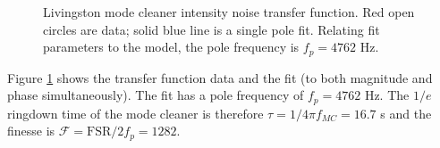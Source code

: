 \begin{figure}
\begin{centering}
\caption[Livingston mode cleaner intensity noise transfer
function]{Livingston mode cleaner intensity noise transfer
  function. Red open circles are data; solid blue line is a single
  pole fit. Relating fit parameters to the model, the pole frequency
  is $f_p=4762$ Hz.}
\label{fig:mcpole}
\end{centering}
\end{figure}

Figure \ref{fig:mcpole} shows the transfer function data and the fit
(to both magnitude and phase simultaneously). The fit has a pole
frequency of $f_p=4762$ Hz. The $1/e$ ringdown time of the mode
cleaner is therefore $\tau = 1/4\pi f_{MC} = 16.7$ \micro s and the
finesse is $\mathcal{F} = \mathrm{FSR}/2f_p = 1282$.





